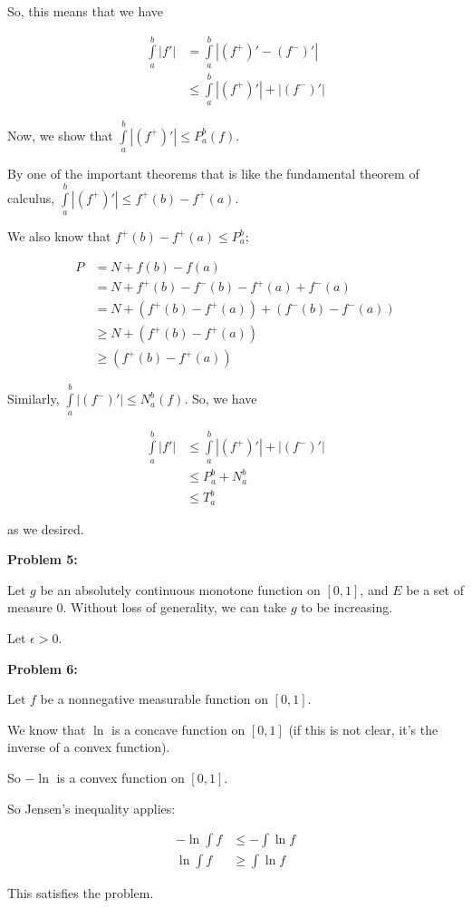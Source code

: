 \documentclass[a4paper,12pt]{article}
\newcommand{\tab}{\hspace{4mm}} %
\newcommand{\shunt}{\vspace{20mm}}
\newcommand{\absval}[1]{\left\lvert #1 \right\rvert}
\newcommand{\ep}{\epsilon}
\begin{document}
So, this means that we have

\begin{align*}
\int\limits_a^b \absval{f'} &= \int\limits_a^b \absval{(f^+)' - (f^-)'} \\
&\leq \int\limits_a^b \absval{(f^+)'} + \absval{(f^-)'}
\end{align*}

Now, we show that $\int\limits_a^b \absval{(f^+)'} \leq P_a^b(f)$.

\tab By one of the important theorems that is like the fundamental theorem of calculus, $\int\limits_a^b \absval{(f^+)'} \leq f^+(b)-f^+(a)$.

\tab We also know that $f^+(b) - f^+(a) \leq P_a^b$; 

\begin{align*}
P &= N +f(b)-f(a)\\
&=N+f^+(b)-f^-(b)-f^+(a)+f^-(a)\\
&=N+(f^+(b)-f^+(a))+(f^-(b)-f^-(a))\\
&\geq N+(f^+(b)-f^+(a))\\
&\geq (f^+(b)-f^+(a))
\end{align*}

Similarly, $\int\limits_a^b \absval{(f^-)'} \leq N_a^b(f)$. So, we have

\begin{align*}
\int\limits_a^b \absval{f'} &\leq \int\limits_a^b \absval{(f^+)'} + \absval{(f^-)'}\\
&\leq P_a^b + N_a^b \\
&\leq T_a^b
\end{align*}

as we desired.

\shunt

{\bf Problem 5:}

Let $g$ be an absolutely continuous monotone function on $[0,1]$, and $E$ be a set of measure $0$. Without loss of generality, we can take $g$ to be increasing. 

Let $\ep>0$.



\shunt

{\bf Problem 6:} 

Let $f$ be a nonnegative measurable function on $[0,1]$.

We know that $\ln$ is a concave function on $[0,1]$ (if this is not clear, it's the inverse of a convex function).

So $-\ln$ is a convex function on $[0,1]$.

So Jensen's inequality applies:

\begin{align*}
-\ln \int f &\leq -\int\ln f \\
\ln \int f & \geq \int \ln f
\end{align*}

This satisfies the problem.

\shunt
\end{document}
